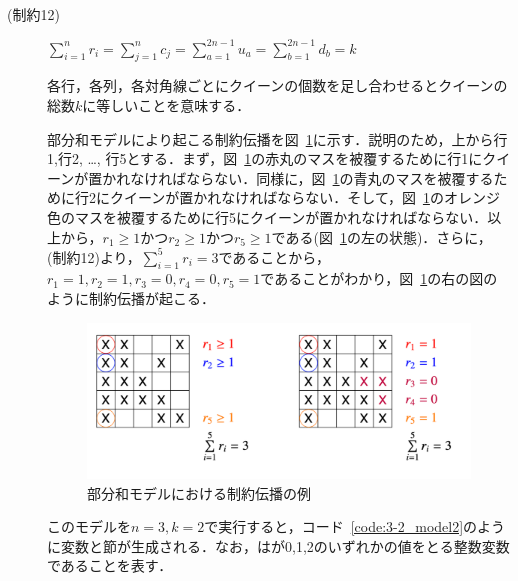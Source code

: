 \begin{description}
 \item[(制約12)] $\sum\limits_{i=1}^{n} r_{i} = \sum\limits_{j=1}^{n} c_{j} =\sum\limits_{a=1}^{2n-1} u_{a} =\sum\limits_{b=1}^{2n-1} d_{b} = k$ \par
各行，各列，各対角線ごとにクイーンの個数を足し合わせるとクイーンの総数$k$に等しいことを意味する．\par

部分和モデルにより起こる制約伝播を図~\ref{fig:constraint}に示す．説明のため，上から行1,行2, \dots , 行5とする．まず，図~\ref{fig:constraint}の赤丸のマスを被覆するために行1にクイーンが置かれなければならない．同様に，図~\ref{fig:constraint}の青丸のマスを被覆するために行2にクイーンが置かれなければならない．そして，図~\ref{fig:constraint}のオレンジ色のマスを被覆するために行5にクイーンが置かれなければならない．以上から，$r_1 \geq 1$かつ$r_2 \geq 1$かつ$r_5 \geq 1$である(図~\ref{fig:constraint}の左の状態)．さらに，(制約12)より，$\sum\limits _{i=1}^{5} r_i = 3$であることから，$r_1 = 1,r_2=1,r_3=0,r_4=0,r_5=1$であることがわかり，図~\ref{fig:constraint}の右の図のように制約伝播が起こる．

\begin{figure}[htb]
  \centering
  \includegraphics[width=1 \linewidth]{fig/fig-constraint.pdf}
  \caption{部分和モデルにおける制約伝播の例}
  \label{fig:constraint}
\end{figure}

このモデルを$n=3,k=2$で実行すると，コード~\ref{code:3-2_model2}のように変数と節が生成される．なお，はが0,1,2のいずれかの値をとる整数変数であることを表す．


\end{description}